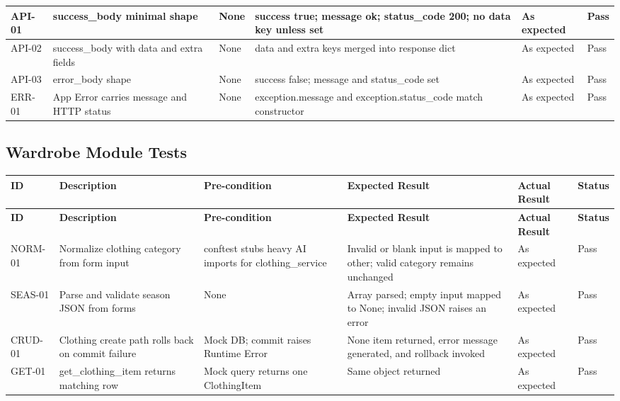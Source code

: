 \begin{appendices}
{\begin{longtable}{|p{1.2cm}|p{3.0cm}|p{2.8cm}|p{3.2cm}|p{2.2cm}|p{1.1cm}|}
API-01 &
success\_body minimal shape &
None &
success true; message ok; status\_code 200; no data key unless set &
As expected &
Pass \\
\hline

API-02 &
success\_body with data and extra fields &
None &
data and extra keys merged into response dict &
As expected &
Pass \\
\hline

API-03 &
error\_body shape &
None &
success false; message and status\_code set &
As expected &
Pass \\
\hline

ERR-01 &
App Error carries message and HTTP status &
None &
exception.message and exception.status\_code match constructor &
As expected &
Pass \\
\hline

\end{longtable}

\subsection*{Wardrobe Module Tests}
\begin{longtable}{|p{1.2cm}|p{3.0cm}|p{2.8cm}|p{3.2cm}|p{2.2cm}|p{1.1cm}|}
\hline
\textbf{ID} & \textbf{Description} & \textbf{Pre-condition} & \textbf{Expected Result} & \textbf{Actual Result} & \textbf{Status} \\
\hline
\endfirsthead
\hline
\textbf{ID} & \textbf{Description} & \textbf{Pre-condition} & \textbf{Expected Result} & \textbf{Actual Result} & \textbf{Status} \\
\hline
\endhead
\hline
\endfoot

NORM-01 &
Normalize clothing category from form input &
conftest stubs heavy AI imports for clothing\_service &
Invalid or blank input is mapped to other; valid category remains unchanged &
As expected &
Pass \\
\hline

SEAS-01 &
Parse and validate season JSON from forms &
None &
Array parsed; empty input mapped to None; invalid JSON raises an error &
As expected &
Pass \\
\hline

CRUD-01 &
Clothing create path rolls back on commit failure &
Mock DB; commit raises Runtime Error &
None item returned, error message generated, and rollback invoked &
As expected &
Pass \\
\hline

GET-01 &
get\_clothing\_item returns matching row &
Mock query returns one ClothingItem &
Same object returned &
As expected &
Pass \\
\hline


\end{longtable}}
\end{appendices}
